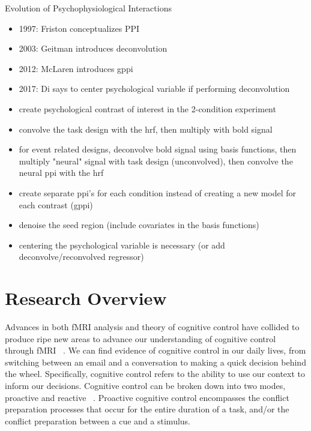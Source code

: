 \documentclass[phd,appendix,figures]{uithesis}
\begin{document}
Evolution of Psychophysiological Interactions
\begin{itemize}
	\item 1997: Friston conceptualizes PPI
	\item 2003: Geitman introduces deconvolution
	\item 2012: McLaren introduces gppi
	\item 2017: Di says to center psychological variable if performing deconvolution
	\item create psychological contrast of interest in the 2-condition experiment
	\item convolve the task design with the hrf, then multiply with bold signal
	\item for event related designs, deconvolve bold signal using basis functions,
		  then multiply "neural" signal with task design (unconvolved), then convolve
		  the neural ppi with the hrf
	\item create separate ppi's for each condition instead of creating a new model for each contrast (gppi)
	\item denoise the seed region (include covariates in the basis functions)
	\item centering the psychological variable is necessary (or add deconvolve/reconvolved regressor)
	       
\end{itemize}


\chapter{Research Overview}

Advances in both fMRI analysis and theory of cognitive control have collided to produce ripe new areas to advance our understanding of cognitive control through fMRI ~\citep{Braver2012,Rissman2004,Mumford2012,Cisler2012}.
We can find evidence of cognitive control in our daily lives, from switching between an email and a conversation to making a quick decision behind the wheel. 
Specifically, cognitive control refers to the ability to use our context to inform our decisions. Cognitive control can be broken down into two modes, proactive and reactive ~\citep{Braver2012}. 
Proactive cognitive control encompasses the conflict preparation processes that occur for the entire duration of a task, and/or the conflict preparation between a cue and a stimulus.
\end{document}
